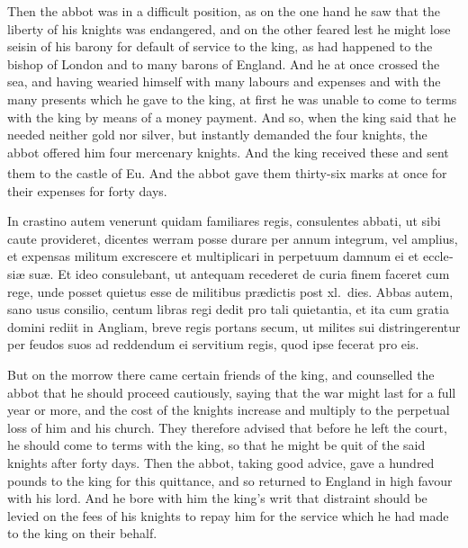 \documentclass[10pt]{book}
\newcounter{engnote}
\newcommand{\engnotenum}{\textsuperscript{\arabic{engnote}\stepcounter{engnote}}}
\begin{document}
\begin{paracol}{2}
\switchcolumn

Then the abbot was in a difficult position, as on the one hand he saw that the liberty of his knights was endangered, and on the other feared lest he might lose seisin of his barony for default of service to the king, as had happened to the bishop of London and to many barons of England. And he at once crossed the sea, and having wearied himself with many labours and expenses and with the many presents which he gave to the king, at first he was unable to come to terms with the king by means of a money payment. And so, when the king said that he needed neither gold nor silver, but instantly demanded the four knights, the abbot offered him four mercenary knights. And the king received these and sent them to the castle of Eu.\engnotenum{} And the abbot gave them thirty-six marks at once for their expenses for forty days.

\switchcolumn*

\begin{otherlanguage}{latin}
In crastino autem venerunt quidam familiares regis, consulentes abbati, ut sibi caute provideret, dicentes werram posse durare per annum integrum, vel amplius, et expensas militum excrescere et multiplicari in perpetuum damnum ei et ecclesi\ae{} su\ae{}. Et ideo consulebant, ut antequam recederet de curia finem faceret cum rege, unde posset quietus esse de militibus pr\ae{}dictis post xl.\ dies. Abbas autem, sano usus consilio, centum libras regi dedit pro tali quietantia, et ita cum gratia domini rediit in Angliam, breve regis portans secum, ut milites sui distringerentur per feudos suos ad reddendum ei servitium regis, quod ipse fecerat pro eis.
\end{otherlanguage}

\switchcolumn

But on the morrow there came certain friends of the king, and counselled the abbot that he should proceed cautiously, saying that the war might last for a full year or more, and the cost of the knights increase and multiply to the perpetual loss of him and his church. They therefore advised that before he left the court, he should come to terms with the king, so that he might be quit of the said knights after forty days. Then the abbot, taking good advice, gave a hundred pounds to the king for this quittance, and so returned to England in high favour with his lord. And he bore with him the king's writ that distraint should be levied on the fees of his knights to repay him for the service which he had made to the king on their behalf.


\end{paracol}
\end{document}
